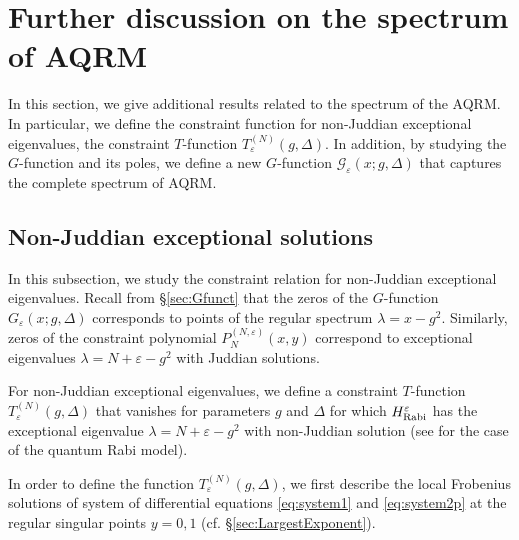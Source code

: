 \documentclass[11pt]{article}
\numberwithin{equation}{section}
\newcommand{\e}{\varepsilon}
\newcommand{\HRabi}[1]{H_{\text{\upshape Rabi}}^{#1}} %
\newcommand{\cp}[2]{P^{(#1)}_{#2}} %
\theoremstyle{plain}
\theoremstyle{definition}
\theoremstyle{remark}
\begin{document}
\section{Further discussion on the spectrum of AQRM}\label{sec:excepteigen}

In this section, we give additional results related to the spectrum of the AQRM. In particular, we define the
constraint function for non-Juddian exceptional eigenvalues, the constraint \(T\)-function \(T_\e^{(N)}(g,\Delta)\).
In addition, by studying the $G$-function and its poles, we define a new $G$-function $\mathcal{G}_\e(x;g,\Delta)$ that
captures the complete spectrum of AQRM.

\subsection{Non-Juddian exceptional solutions} \label{sec:NonJuddian}\label{Non-Juddian}

In this subsection, we study the constraint relation for non-Juddian exceptional eigenvalues.
Recall from \S \ref{sec:Gfunct} that the zeros of the \(G\)-function \(G_{\e}(x;g,\Delta)\)
corresponds to points of the regular spectrum \(\lambda = x - g^2 \).
Similarly, zeros of the constraint polynomial \(\cp{N,\e}{N}(x,y)\)
correspond to exceptional eigenvalues \(\lambda = N + \e  - g^2\) with Juddian solutions.

For non-Juddian exceptional eigenvalues, we define a constraint \(T\)-function \(T_\e^{(N)}(g,\Delta)\)
that vanishes for parameters \(g\) and \(\Delta\) for which \(\HRabi{\e}\) has the exceptional
eigenvalue \(\lambda = N + \e  - g^2\) with non-Juddian solution (see \cite{B2013AP} for the case
of the quantum Rabi model).

In order to define the function \(T_\e^{(N)}(g,\Delta)\), we first describe the local Frobenius solutions of system
of differential equations \eqref{eq:system1} and \eqref{eq:system2p} at the regular singular points $y=0,1$
(cf. \S \ref{sec:LargestExponent}).
\end{document}
